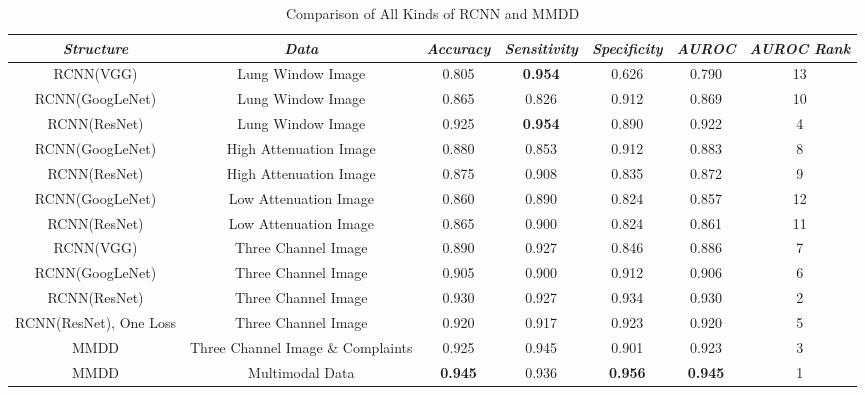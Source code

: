 \documentclass[journal]{IEEEtran}
\begin{document}
\begin{table}[htb]
    \vspace{-0cm}
    \caption{Comparison of All Kinds of RCNN and MMDD}
    \vspace{-0cm}
    \begin{center}
    \begin{tabular}{|c|c|c|c|c|c|c|}
    \hline
    \textbf{\textit{Structure}} & \textbf{\textit{Data}}& \textbf{\textit{Accuracy}}  & \textbf{\textit{Sensitivity}} & \textbf{\textit{Specificity}} & \textbf{\textit{AUROC}}& \textbf{\textit{AUROC Rank}}\\
    \hline
    RCNN(VGG) & Lung Window Image & 0.805 & {\bfseries 0.954} &0.626 &0.790 &13\\
    RCNN(GoogLeNet) & Lung Window Image& 0.865 & 0.826 & 0.912 & 0.869 &10\\
    RCNN(ResNet) & Lung Window Image & 0.925 & {\bfseries 0.954} & 0.890 & 0.922 &4\\
    RCNN(GoogLeNet) & High Attenuation Image& 0.880 & 0.853 & 0.912 & 0.883 &8\\
    RCNN(ResNet)& High Attenuation Image& 0.875 & 0.908 & 0.835 & 0.872 &9\\
    RCNN(GoogLeNet) & Low Attenuation Image& 0.860 & 0.890 & 0.824 & 0.857 &12\\
    RCNN(ResNet) & Low Attenuation Image& 0.865 & 0.900 & 0.824 & 0.861 &11\\
    RCNN(VGG) & Three Channel Image& 0.890 & 0.927 &0.846 &0.886 &7\\
    RCNN(GoogLeNet)& Three Channel Image & 0.905 & 0.900 & 0.912 & 0.906 &6\\
    RCNN(ResNet) & Three Channel Image& 0.930 & 0.927 & 0.934 & 0.930 &2\\
    RCNN(ResNet), One Loss & Three Channel Image& 0.920 & 0.917 & 0.923 & 0.920 &5\\
    MMDD & Three Channel Image \& Complaints & 0.925 & 0.945 & 0.901 & 0.923 &3\\
    MMDD & Multimodal Data&  {\bfseries 0.945} & 0.936 & {\bfseries 0.956} & {\bfseries 0.945} &1\\
    \hline
    \end{tabular}
    \vspace{-0cm}
    \label{comparison}
    \end{center}
    \vspace{-0cm}
    \end{table}
\end{document}
